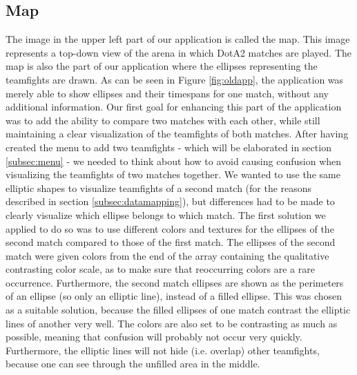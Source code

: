 \documentclass[11pt,twoside,a4paper]{article}
\begin{document}
\subsection{Map}
\label{subsec:map}
The image in the upper left part of our application is called the map. This image represents a top-down view of the arena in which DotA2 matches are played. The map is also the part of our application where the ellipses representing the teamfights are drawn.
As can be seen in Figure \ref{fig:oldapp}, the application was merely able to show ellipses and their timespans for one match, without any additional information.
\newline\newline
Our first goal for enhancing this part of the application was to add the ability to compare two matches with each other, while still maintaining a clear visualization of the teamfights of both matches.\newline
After having created the menu to add two teamfights - which will be elaborated in section \ref{subsec:menu} - we needed to think about how to avoid causing confusion when visualizing the teamfights of two matches together. We wanted to use the same elliptic shapes to visualize teamfights of a second match (for the reasons described in section \ref{subsec:datamapping}), but differences had to be made to clearly visualize which ellipse belongs to which match. The first solution we applied to do so was to use different colors and textures for the ellipses of the second match compared to those of the first match. The ellipses of the second match were given colors from the end of the array containing the qualitative contrasting color scale, as to make sure that reoccurring colors are a rare occurrence. Furthermore, the second match ellipses are shown as the perimeters of an ellipse (so only an elliptic line), instead of a filled ellipse. This was chosen as a suitable solution, because the filled ellipses of one match contrast the elliptic lines of another very well. The colors are also set to be contrasting as much as possible, meaning that confusion will probably not occur very quickly. Furthermore, the elliptic lines will not hide (i.e. overlap) other teamfights, because one can see through the unfilled area in the middle.\newline\newline
\end{document}
